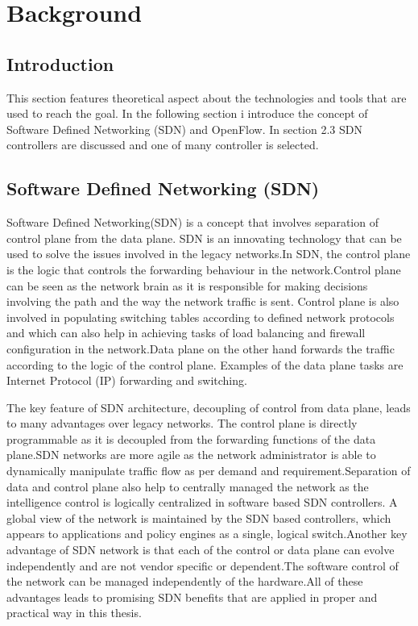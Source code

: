 \chapter{Background}
\label{ch:Analyse}
\section{Introduction}
This section features theoretical aspect about the technologies and tools that are used to reach the goal. In the following section i introduce the concept of Software Defined Networking (SDN) and OpenFlow. In section 2.3 SDN controllers are discussed and one of many controller is selected.    

\section{Software Defined Networking (SDN)}
\label{ch:Analyse:sec:Abschnitt1}

Software Defined Networking(SDN) is a concept that involves separation of control plane from the data plane. SDN is an innovating technology that can be used to solve the issues involved in the legacy networks.In SDN, the control plane is the logic that controls the forwarding behaviour in the network.Control plane can be seen as the network brain as it is responsible for making decisions involving the path and the way the network traffic is sent. Control plane is also involved in populating switching tables according to defined network protocols and which can also help in achieving tasks of load balancing and firewall configuration in the network.Data plane on the other hand forwards the traffic according to the logic of the control plane. Examples of the data plane tasks are Internet Protocol (IP) forwarding and switching\cite {OpenFlow}.

The key feature of SDN architecture, decoupling of control from data plane, leads to many advantages over legacy networks. The control plane is directly programmable as it is decoupled from the forwarding functions of the data plane.SDN networks are more agile as the network administrator is able to dynamically manipulate traffic flow as per demand and requirement.Separation of data and control plane also help to centrally managed the network as the intelligence control is logically centralized in software based SDN controllers. A global view of the network is maintained by the SDN based controllers, which appears to applications and policy engines as a single, logical switch.Another key advantage of SDN network is that each of the control or data plane can evolve independently and are not vendor specific or dependent.The software control of the network can be managed independently of the hardware\cite {OpenFlow}.All of these advantages leads to promising SDN benefits that are applied in proper and practical way in this thesis.  


